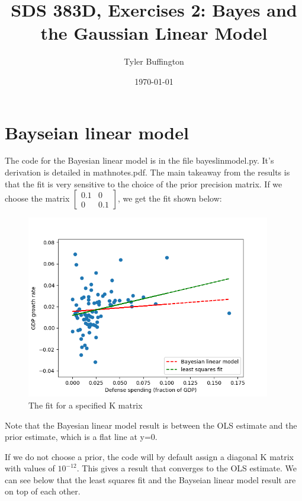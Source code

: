 \documentclass[10pt]{article}
\begin{document}
    \title{SDS 383D, Exercises 2: Bayes and the Gaussian Linear Model}
    \author{Tyler Buffington}
    \date{\today}
    \maketitle

    \section*{Bayseian linear model}
    The code for the Bayesian linear model is in the file bayeslinmodel.py. It's derivation is detailed in mathnotes.pdf. The main takeaway from the results is that the fit is very sensitive to the choice of the prior precision matrix. If we choose the matrix $\begin{bmatrix} 0.1 & 0 \\ 0 & 0.1 \end{bmatrix}$, we get the fit shown below:

     \begin{figure}[htb] \centering
         \includegraphics[width=0.95\textwidth]{./linear_bayes_prior.png}
         \caption{The fit for a specified K matrix}
         \label{fig:bayes_wprior}
     \end{figure}

    Note that the Bayesian linear model result is between the OLS estimate and the prior estimate, which is a flat line at y=0.

    If we do not choose a prior, the code will by default assign a diagonal K matrix with values of $10^{-12}$. This gives a result that converges to the OLS estimate. We can see below that the least squares fit and the Bayseian linear model result are on top of each other.
\end{document}
